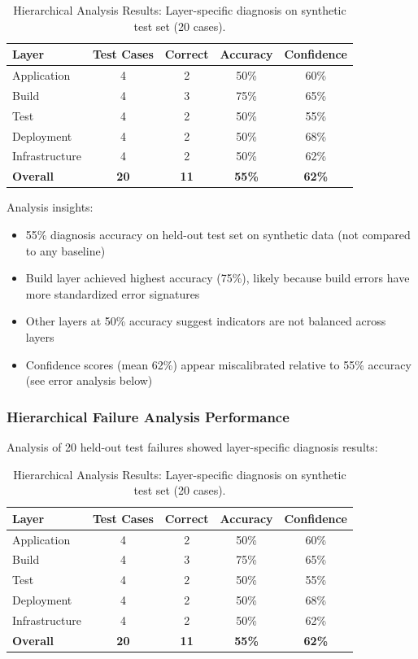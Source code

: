 \documentclass[11pt]{article}
\begin{document}
\begin{table}[h!]
\centering
\begin{tabular}{lcccc}
\toprule
\textbf{Layer} & \textbf{Test Cases} & \textbf{Correct} & \textbf{Accuracy} & \textbf{Confidence} \\
\midrule
Application & 4 & 2 & 50\% & 60\% \\
Build & 4 & 3 & 75\% & 65\% \\
Test & 4 & 2 & 50\% & 55\% \\
Deployment & 4 & 2 & 50\% & 68\% \\
Infrastructure & 4 & 2 & 50\% & 62\% \\
\midrule
\textbf{Overall} & \textbf{20} & \textbf{11} & \textbf{55\%} & \textbf{62\%} \\
\bottomrule
\end{tabular}
\caption{Hierarchical Analysis Results: Layer-specific diagnosis on synthetic test set (20 cases).}
\label{tab:analysis_results}
\end{table}

Analysis insights:
\begin{itemize}
    \item 55\% diagnosis accuracy on held-out test set on synthetic data (not compared to any baseline)
    \item Build layer achieved highest accuracy (75\%), likely because build errors have more standardized error signatures
    \item Other layers at 50\% accuracy suggest indicators are not balanced across layers
    \item Confidence scores (mean 62\%) appear miscalibrated relative to 55\% accuracy (see error analysis below)
\end{itemize}

\subsubsection{Hierarchical Failure Analysis Performance}

Analysis of 20 held-out test failures showed layer-specific diagnosis results:

\begin{table}[h!]
\centering
\begin{tabular}{lcccc}
\toprule
\textbf{Layer} & \textbf{Test Cases} & \textbf{Correct} & \textbf{Accuracy} & \textbf{Confidence} \\
\midrule
Application & 4 & 2 & 50\% & 60\% \\
Build & 4 & 3 & 75\% & 65\% \\
Test & 4 & 2 & 50\% & 55\% \\
Deployment & 4 & 2 & 50\% & 68\% \\
Infrastructure & 4 & 2 & 50\% & 62\% \\
\midrule
\textbf{Overall} & \textbf{20} & \textbf{11} & \textbf{55\%} & \textbf{62\%} \\
\bottomrule
\end{tabular}
\caption{Hierarchical Analysis Results: Layer-specific diagnosis on synthetic test set (20 cases).}
\label{tab:analysis_results}
\end{table}
\end{document}
